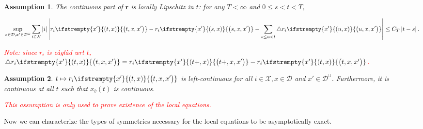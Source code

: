 \documentclass[12pt]{article}
\newcommand{\mc}{\mathcal}
\newcommand{\ov}{\overline}
\newcommand{\tr}{\textcolor{red}}
\newcommand{\cad}{\mc{D}}							%
\newcommand{\sta}{\mc{X}}							%
\newcommand{\cl}[1]{\ov{#1}}						%
\newcommand{\rate}{r}								%
\newcommand{\xf}{x}									%
\newcommand{\delt}{\triangle}						%
\newcommand{\vind}[1]{_{#1}}						%
\newcommand{\tme}[1]{(#1)}							%
\newcommand{\stpara}[1]{_{#1}}						%
\newcommand{\rateset}{\mathbf{\rate}}				%
\newcommand{\jumpbd}[1]{C_{#1}}						%
\newcommand{\tmepro}[3]{
\ifstrempty{#3}{
	\left(#1,#2\right)}{
	\left(#1,#2,#3\right)}}							%
\newtheorem{assu}{Assumption}
\begin{document}
\begin{assu}
The continuous part of \(\rateset\) is locally Lipschitz in \(t\): for any \(T < \infty\) and \(0\leq s < t < T\),

\begin{equation}
\sup_{\xf \in \cad, \xf'\in \cad^\sqcup} \sum_{i\in \sta}|i|\left|\rate\stpara{i}\tmepro{t}{\xf}{\xf'} - \rate\stpara{i}\tmepro{s}{\xf}{\xf'} - \sum_{s\leq u < t} \delt \rate\stpara{i}\tmepro{u}{\xf}{\xf'}\right| \leq \jumpbd{T}\left|t - s\right|.
\label{a::tLipschitz}
\end{equation}

\tr{Note: since \(\rate\stpara{i}\) is c\`agl\`ad wrt \(t\), \(\delt\rate\stpara{i}\tmepro{t}{\xf}{\xf'} = \rate\stpara{i}\tmepro{t+}{\xf}{\xf'} - \rate\stpara{i}\tmepro{t}{\xf}{\xf'}\).}
\label{a::liprt}
\end{assu}

\begin{assu}
\(t\mapsto \rate\stpara{i}\tmepro{t}{\xf}{\xf'}\) is left-continuous for all \(i\in \sta,\xf\in \cad\) and \(\xf'\in \cad^\sqcup\). Furthermore, it is continuous at all \(t\) such that \(\xf\vind{\cl{v}}\tme{t}\) is continuous. 

\tr{This assumption is only used to prove existence of the local equations.}
\label{a::lctr}
\end{assu}

Now we can characterize the types of symmetries necessary for the local equations to be asymptotically exact.
\end{document}
